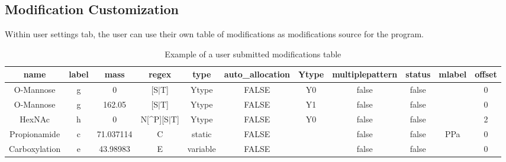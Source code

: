 \documentclass[10pt,a4paper]{memoir}
\begin{document}
\subsection{Modification Customization}
Within user settings tab, the user can use their own table of modifications as modifications source for the program.
\begin{table}
	
	\centering
	\caption{Example of a user submitted modifications table}
	\begin{adjustbox}{width=1\textwidth}
		\small
		\begin{tabular}{c c c c c c c c c c c}
			\hline name & label & mass & regex & type & auto\_allocation & Ytype & multiplepattern & status & mlabel & offset \\ [0.1ex]
			\hline\hline
			O-Mannose & g & 0 & [S$|$T] & Ytype & FALSE & Y0 & false & false & & 0 \\
			O-Mannose & g & 162.05 & [S$|$T] & Ytype & FALSE & Y1 & false & false & & 0 \\
			HexNAc & h & 0 & N[\^{}P][S$|$T] & Ytype & FALSE & Y0 & false & false & & 2 \\
			Propionamide & c & 71.037114 & C & static & FALSE &  & false & false & PPa & 0 \\
			Carboxylation & e & 43.98983 & E & variable & FALSE &  & false & false &  & 0 \\
		\end{tabular}
	\end{adjustbox}
	
\end{table}
\end{document}
